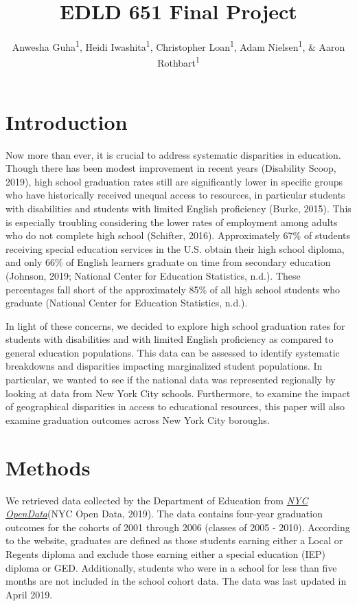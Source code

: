 \documentclass[
  english,
  man, fleqn, noextraspace]{apa6}
\title{EDLD 651 Final Project}
\author{Anwesha Guha\textsuperscript{1}, Heidi Iwashita\textsuperscript{1}, Christopher Loan\textsuperscript{1}, Adam Nielsen\textsuperscript{1}, \& Aaron Rothbart\textsuperscript{1}}
\date{}
\affiliation{\vspace{0.5cm}\textsuperscript{1} University of Oregon}
\begin{document}
\maketitle

\hypertarget{introduction}{%
\section{Introduction}\label{introduction}}

Now more than ever, it is crucial to address systematic disparities in education. Though there has been modest improvement in recent years (Disability Scoop, 2019), high school graduation rates still are significantly lower in specific groups who have historically received unequal access to resources, in particular students with disabilities and students with limited English proficiency (Burke, 2015). This is especially troubling considering the lower rates of employment among adults who do not complete high school (Schifter, 2016). Approximately 67\% of students receiving special education services in the U.S. obtain their high school diploma, and only 66\% of English learners graduate on time from secondary education (Johnson, 2019; National Center for Education Statistics, n.d.). These percentages fall short of the approximately 85\% of all high school students who graduate (National Center for Education Statistics, n.d.).

In light of these concerns, we decided to explore high school graduation rates for students with disabilities and with limited English proficiency as compared to general education populations. This data can be assessed to identify systematic breakdowns and disparities impacting marginalized student populations. In particular, we wanted to see if the national data was represented regionally by looking at data from New York City schools. Furthermore, to examine the impact of geographical disparities in access to educational resources, this paper will also examine graduation outcomes across New York City boroughs.

\hypertarget{methods}{%
\section{Methods}\label{methods}}

We retrieved data collected by the Department of Education from \href{https://data.cityofnewyork.us/Education/2005-2010-Graduation-Outcomes-By-Borough/avir-tzek}{\emph{NYC OpenData}}(NYC Open Data, 2019). The data contains four-year graduation outcomes for the cohorts of 2001 through 2006 (classes of 2005 - 2010). According to the website, graduates are defined as those students earning either a Local or Regents diploma and exclude those earning either a special education (IEP) diploma or GED. Additionally, students who were in a school for less than five months are not included in the school cohort data. The data was last updated in April 2019.
\end{document}
